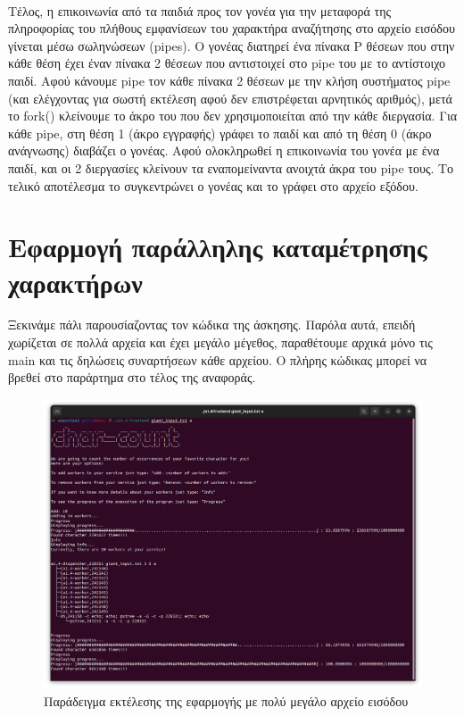 \documentclass{article}
\begin{document}
	\\
	Τέλος, η επικοινωνία από τα παιδιά προς τον γονέα για την μεταφορά της πληροφορίας του πλήθους εμφανίσεων του χαρακτήρα αναζήτησης στο αρχείο εισόδου γίνεται μέσω σωληνώσεων (pipes). Ο γονέας διατηρεί ένα πίνακα P θέσεων που στην κάθε θέση έχει έναν πίνακα 2 θέσεων που αντιστοιχεί στο pipe του με το αντίστοιχο παιδί. Αφού κάνουμε pipe τον κάθε πίνακα 2 θέσεων με την κλήση συστήματος pipe (και ελέγχοντας για σωστή εκτέλεση αφού δεν επιστρέφεται αρνητικός αριθμός), μετά το fork() κλείνουμε το άκρο του που δεν χρησιμοποιείται από την κάθε διεργασία. Για κάθε pipe, στη θέση 1 (άκρο εγγραφής) γράφει το παιδί και από τη θέση 0 (άκρο ανάγνωσης) διαβάζει ο γονέας. Αφού ολοκληρωθεί η επικοινωνία του γονέα με ένα παιδί, και οι 2 διεργασίες κλείνουν τα εναπομείναντα ανοιχτά άκρα του pipe τους. Το τελικό αποτέλεσμα το συγκεντρώνει ο γονέας και το γράφει στο αρχείο εξόδου.
	
	\section{Εφαρμογή παράλληλης καταμέτρησης χαρακτήρων}
	
	Ξεκινάμε πάλι παρουσίαζοντας τον κώδικα της άσκησης. Παρόλα αυτά, επειδή χωρίζεται σε πολλά αρχεία και έχει μεγάλο μέγεθος, παραθέτουμε αρχικά μόνο τις main και τις δηλώσεις συναρτήσεων κάθε αρχείου. Ο πλήρης κώδικας μπορεί να βρεθεί στο παράρτημα στο τέλος της αναφοράς.
	
	
	
	
	
	
	
	
	
	\begin{figure}[H]
		\centering
		\includegraphics[width=\textwidth]{a1.4_Execution.png}
		\caption{Παράδειγμα εκτέλεσης της εφαρμογής με πολύ μεγάλο αρχείο εισόδου}
	\end{figure}
	
\end{document}
